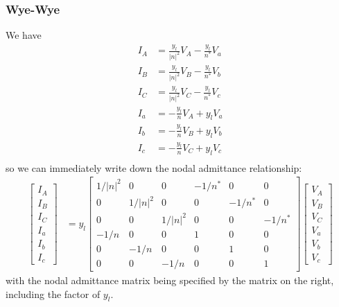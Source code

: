 \documentclass[10pt]{article}
\begin{document}
\subsubsection{Wye-Wye}
We have
\begin{align}
I_{A} &= \frac{y_l}{|n|^2}V_A - \frac{y_l}{n^*}V_a \\
I_{B} &= \frac{y_l}{|n|^2}V_B - \frac{y_l}{n^*}V_b \\
I_{C} &= \frac{y_l}{|n|^2}V_C - \frac{y_l}{n^*}V_c \\
I_a &= -\frac{y_l}{n}V_A + y_l V_a \\
I_b &= -\frac{y_l}{n}V_B + y_l V_b \\
I_c &= -\frac{y_l}{n}V_C + y_l V_c \\
\end{align}
so we can immediately write down the nodal admittance relationship:
\begin{align}
\begin{bmatrix}I_A \\ I_B \\ I_C \\ I_a \\ I_b \\ I_c\end{bmatrix} &=
y_l \begin{bmatrix}
	1/|n|^2 & 0 & 0 & -1/n^* & 0 & 0 \\
	0 & 1/|n|^2 & 0 & 0 & -1/n^* & 0 \\
	0 & 0 & 1/|n|^2 & 0 & 0 & -1/n^* \\
	-1/n & 0 & 0 & 1 & 0 & 0 \\
	0 & -1/n & 0 & 0 & 1 & 0 \\
	0 & 0 & -1/n & 0 & 0 & 1
\end{bmatrix}
\begin{bmatrix}V_A \\ V_B \\ V_C \\ V_a \\ V_b \\ V_c\end{bmatrix}
\end{align}
with the nodal admittance matrix being specified by the matrix on the right, including the factor of $y_l$.
\end{document}
